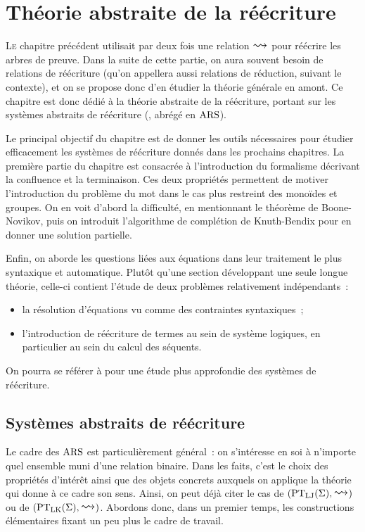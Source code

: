 \chapter{Théorie abstraite de la réécriture}
\label{chp.reecr}

\minitoc

\lettrine{L}{e} chapitre précédent utilisait par deux fois une relation
$\reecr{}$ pour réécrire les arbres de preuve. Dans la suite de cette
partie, on aura souvent besoin de relations de réécriture (qu'on
appellera aussi relations de réduction, suivant le contexte), et on se
propose donc d'en étudier la théorie générale en amont. Ce chapitre est
donc dédié à la théorie abstraite de la réécriture, portant sur les
systèmes abstraits de réécriture (,
abrégé en $\operatorname{ARS}$).

Le principal objectif du chapitre est de donner les outils nécessaires
pour étudier efficacement les systèmes de réécriture donnés dans les
prochains chapitres. La première partie du chapitre est consacrée
à l'introduction du formalisme décrivant la confluence et la terminaison.
Ces deux propriétés permettent de motiver l'introduction du problème
du mot dans le cas plus restreint des monoïdes et groupes. On en voit d'abord
la difficulté, en mentionnant le théorème de Boone-Novikov, puis on introduit
l'algorithme de complétion de Knuth-Bendix pour en donner une solution
partielle.

Enfin, on aborde les questions liées aux équations dans leur traitement le plus
syntaxique et automatique. Plutôt qu'une section développant une seule longue
théorie, celle-ci contient l'étude de deux problèmes relativement indépendants~:
\begin{itemize}
\item la résolution d'équations vu comme des contraintes syntaxiques~;
\item l'introduction de réécriture de termes au sein de système logiques, en
  particulier au sein du calcul des séquents.
\end{itemize}

On pourra se référer à \cite{BaaderNipkow1998} pour une étude plus
approfondie des systèmes de réécriture.

\section{Systèmes abstraits de réécriture}

Le cadre des $\operatorname{ARS}$ est particulièrement général~: on s'intéresse en soi à
n'importe quel ensemble muni d'une relation binaire. Dans les faits, c'est
le choix des propriétés d'intérêt ainsi que des objets concrets auxquels on
applique la théorie qui donne à ce cadre son sens. Ainsi, on peut déjà citer
le cas de $(\ProofLJ(\Sign),\reecr{})$ ou de $(\ProofLK(\Sign),\reecr{})$.
Abordons donc, dans un premier temps, les constructions élémentaires
fixant un peu plus le cadre de travail.

